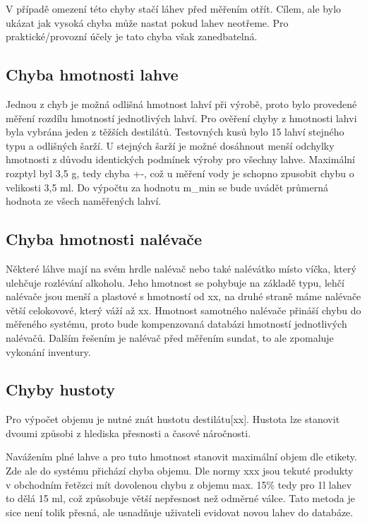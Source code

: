V případě omezení této chyby stačí láhev před měřením otřít. Cílem, ale bylo ukázat jak vysoká chyba může nastat pokud lahev neotřeme. Pro praktické/provozní účely je tato chyba však zanedbatelná.

\subsection{Chyba hmotnosti lahve}
Jednou z chyb je možná odlišná hmotnost lahví při výrobě, proto bylo provedené měření rozdílu hmotností jednotlivých lahví. Pro ověření chyby z hmotnosti lahvi byla vybrána jeden z těžších destilátů. Testovných kusů bylo 15 lahví stejného typu a odlišných šarží. U stejných šarží je možné dosáhnout menší odchylky hmotnosti z důvodu identických podmínek výroby pro všechny lahve. 
Maximální rozptyl byl 3,5 g, tedy chyba +-, což u měření vody je schopno zpusobit chybu o velikosti 3,5 ml. Do výpočtu za hodnotu m\_min se bude uvádět průmerná hodnota ze všech naměřených lahví.


\subsection{Chyba hmotnosti nalévače}
Některé láhve mají na svém hrdle nalévač nebo také nalévátko místo víčka, který ulehčuje rozlévání alkoholu. Jeho hmotnost se pohybuje na základě typu, lehčí nalévače jsou menší a plastové s hmotností od xx, na druhé straně máme nalévače větší celokovové, který váží až xx. Hmotnost samotného nalévače přináší chybu do měřeného systému, proto bude kompenzovaná databázi hmotností jednotlivých nalévačů. Dalším řešením je nalévač před měřením sundat, to ale zpomaluje vykonání inventury.   

\subsection{Chyby hustoty}

Pro výpočet objemu je nutné znát hustotu destilátu[xx]. Hustota lze stanovit dvoumi způsobi z hlediska přesnosti a časové náročnosti.


Navážením plné lahve a pro tuto hmotnost stanovit maximální objem dle etikety. Zde ale do systému přichází chyba objemu. Dle normy xxx jsou tekuté produkty v obchodním řetězci mít dovolenou chybu z objemu max. 15\% tedy pro 1l lahev to dělá 15 ml, což způsobuje větší nepřesnost než odměrné válce. Tato metoda je sice není tolik přesná, ale usnadňuje uživateli evidovat novou lahev do databáze.

